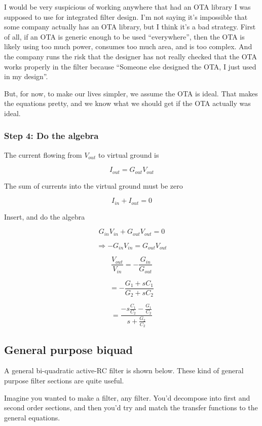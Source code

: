 I would be very suspicious of working anywhere that had an OTA library I
was supposed to use for integrated filter design. I'm not saying it's
impossible that some company actually has an OTA library, but I think
it's a bad strategy. First of all, if an OTA is generic enough to be
used ``everywhere'', then the OTA is likely using too much power,
consumes too much area, and is too complex. And the company runs the
risk that the designer has not really checked that the OTA works
properly in the filter because ``Someone else designed the OTA, I just
used in my design''.

But, for now, to make our lives simpler, we assume the OTA is ideal.
That makes the equations pretty, and we know what we should get if the
OTA actually was ideal.

\subsubsection{Step 4: Do the algebra}\label{step-4-do-the-algebra}

The current flowing from \(V_{out}\) to virtual ground is

\[I_{out}= G_{out}V_{out}\]

The sum of currents into the virtual ground must be zero

\[ I_{in} + I_{out} = 0\]

Insert, and do the algebra

\[ G_{in}V_{in} + G_{out}V_{out} = 0\]

\[ \Rightarrow - G_{in} V_{in} = G_{out} V_{out}\]

\[ \frac{V_{out}}{V_{in}} = - \frac{G_{in}}{G_{out}}\]

\[ = - \frac{ G_1 + s C_1 }{G_2 + sC_2}\]

\[ = \frac{ -s \frac{C_1}{C_2} - \frac{G_1}{C_2} }{s + \frac{G_2}{C_2}}\]

\subsection{General purpose biquad}\label{general-purpose-biquad}

A general bi-quadratic active-RC filter is shown below. These kind of
general purpose filter sections are quite useful.

Imagine you wanted to make a filter, any filter. You'd decompose into
first and second order sections, and then you'd try and match the
transfer functions to the general equations.

